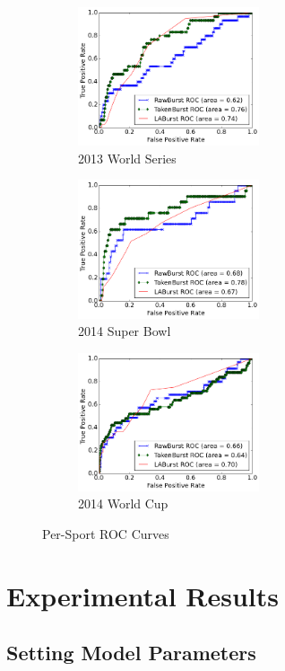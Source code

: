 \documentclass[letterpaper]{article}
\begin{document}
\begin{figure}[tb]
\centering
\begin{subfigure}[b]{0.3\textwidth}
\centering
\includegraphics[width=2.1in]{./figures/roc_2013_WorldSeries.png}
\caption{2013 World Series}
\label{fig:roc2013WorldSeries}
\end{subfigure}
\begin{subfigure}[b]{0.3\textwidth}
\centering
\includegraphics[width=2.1in]{./figures/roc_2014_SuperBowl.png}
\caption{2014 Super Bowl}
\label{fig:roc2014SuperBowl}
\end{subfigure}
\begin{subfigure}[b]{0.3\textwidth}
\centering
\includegraphics[width=2.1in]{./figures/roc_2014_WorldCup.png}
\caption{2014 World Cup}
\label{fig:roc2014WorldCup}
\end{subfigure}
\caption{Per-Sport ROC Curves}
\label{fig:joinedPerf}
\end{figure}

\section{Experimental Results}
\label{sect:results}

\subsection{Setting Model Parameters}
\end{document}
